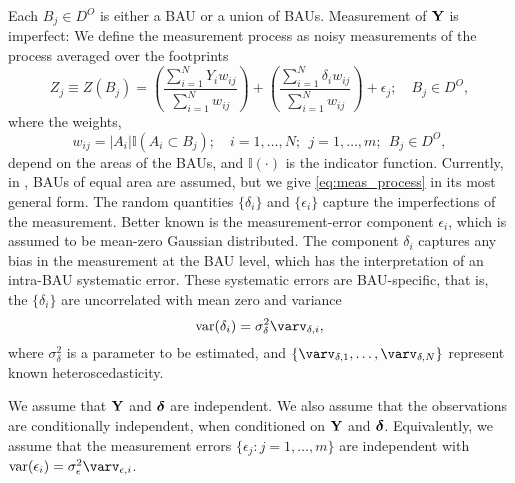 Each $B_j \in D^O$ is either a BAU or a union of BAUs. Measurement of $\mathbf{Y}$ is imperfect: We define the measurement process as noisy measurements of the process averaged over the footprints
\begin{equation}\label{eq:meas_process}
Z_j \equiv Z(B_j) = \left(\frac{\sum_{i =1}^N Y_i w_{ij}}{\sum_{i=1}^N w_{ij}}\right) + \left(\frac{\sum_{i =1}^N \delta_i w_{ij}}{\sum_{i=1}^N w_{ij}}\right) + \epsilon_j; \quad B_j \in D^O,
\end{equation}
where the weights,
$$ w_{ij} = |A_i|\mathbb{I}(A_i \subset B_j); \quad i = 1,\dots,N;~~j = 1,\dots, m; ~~B_j \in D^O,$$
depend on the areas of the BAUs, and $\mathbb{I}(\cdot)$ is the indicator function. Currently, in , BAUs of equal area are assumed, but we give \eqref{eq:meas_process} in its most general form.   The random quantities $\{\delta_i\}$ and $\{\epsilon_i\}$ capture the imperfections of the measurement. Better known is the measurement-error component $\epsilon_i$, which is assumed to be mean-zero Gaussian distributed. The component $\delta_i$ captures any bias in the measurement at the BAU level, which has the interpretation of an intra-BAU systematic error. These systematic errors are BAU-specific, that is, the $\{\delta_i\}$ are uncorrelated with mean zero and variance
\begin{equation*}
\var(\delta_i) = \sigma^2_\delta \varv_{\delta,i},
\end{equation*}
where $\sigma^2_\delta$ is a parameter to be estimated, and $\{\varv_{\delta,1},\dots,\varv_{\delta,N}\}$  represent known heteroscedasticity.

We assume that $\mathbf{Y}$ and ${\boldsymbol{\delta}}$ are independent. We also assume that the observations are conditionally independent, when conditioned on $\mathbf{Y}$ and ${\boldsymbol{\delta}}$. Equivalently, we assume that the measurement errors $\{\epsilon_j: j = 1,\dots,m\}$ are independent with $\var(\epsilon_i) = \sigma^2_\epsilon\varv_{\epsilon,i}$.

